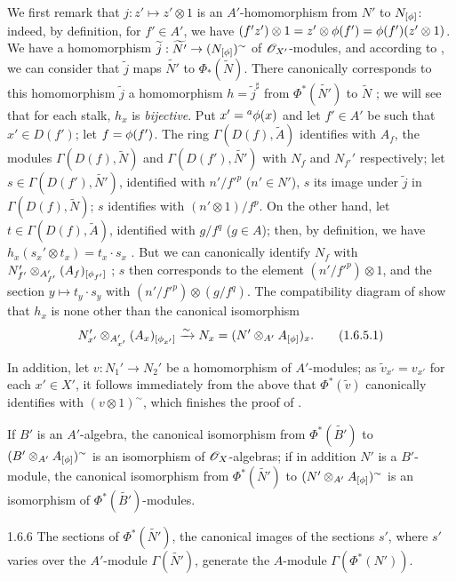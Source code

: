 We first remark that $j:z'\mapsto z'\otimes 1$ is an $A'$-homomorphism from $N'$ to
$N_{[\phi]}$: indeed, by definition, for $f'\in A'$, we have
$(f'z')\otimes 1=z'\otimes\phi(f')=\phi(f')(z'\otimes 1)$. We have  a
homomorphism $\widetilde{j}:\widetilde{N'}\to(N_{[\phi]})^\sim$ of $\mathscr{O}_{X'}$-modules, and
according to , we can consider that $\widetilde{j}$ maps $\widetilde{N'}$
to $\Phi_*(\widetilde{N})$. There canonically corresponds to this homomorphism
$\widetilde{j}$ a homomorphism $h=\widetilde{j}^\sharp$ from $\Phi^*(\widetilde{N'})$ to
$\widetilde{N}$ ; we will see that for each stalk, $h_x$ is \emph{bijective}.
Put $x'={}^a\phi(x)$ and let $f'\in A'$ be such that $x'\in D(f')$; let $f=\phi(f')$. The
ring $\Gamma(D(f),\widetilde{A})$ identifies with $A_f$, the modules
$\Gamma(D(f),\widetilde{N})$ and $\Gamma(D(f'),\widetilde{N'})$ with $N_f$ and $N_{f'}'$
respectively; let $s\in\Gamma(D(f'),\widetilde{N'})$, identified with $n'/{f'}^p$
($n'\in N'$), $s$ its image under $\widetilde{j}$ in $\Gamma(D(f),\widetilde{N})$; $s$
identifies with $(n'\otimes 1)/f^p$. On the other hand, let $t\in\Gamma(D(f),\widetilde{A})$,
identified with $g/f^q$ ($g\in A$); then, by definition, we have
$h_x(s_x'\otimes t_x)=t_x\cdot s_x$ . But we can canonically identify $N_f$
with $N_{f'}'\otimes_{A_{f'}'}(A_f)_{[\phi_{f'}]}$ ; $s$ then corresponds
to the element $(n'/{f'}^p)\otimes 1$, and the section $y\mapsto t_y\cdot s_y$ with
$(n'/{f'}^p)\otimes(g/f^q)$. The compatibility diagram of  show that $h_x$
is none other than the canonical isomorphism
\[
  N_{x'}'\otimes_{A_{x'}'}(A_x)_{[\phi_{x'}]}\xrightarrow{\sim} N_x=(N'\otimes_{A'}A_{[\phi]})_x.
  \tag{1.6.5.1}
\]

In addition, let $v:N_1'\to N_2'$ be a homomorphism of $A'$-modules; as
$\widetilde{v}_{x'}=v_{x'}$ for each $x'\in X'$, it follows immediately from the above that
$\Phi^*(\widetilde{v})$ canonically identifies with $(v\otimes 1)^\sim$, which finishes the
proof of .

If $B'$ is an $A'$-algebra, the canonical isomorphism from $\Phi^*(\widetilde{B'})$ to
$(B'\otimes_{A'}A_{[\phi]})^\sim$ is an isomorphism of $\mathscr{O}_X$-algebras; if in addition $N'$
is a $B'$-module, the canonical isomorphism from $\Phi^*(\widetilde{N'})$ to
$(N'\otimes_{A'}A_{[\phi]})^\sim$ is an isomorphism of $\Phi^*(\widetilde{B'})$-modules.

\begin{envs}[Corollary]{1.6.6}
\label{cor-1.1.6.6}
The sections of $\Phi^*(\widetilde{N'})$, the canonical images of the sections $s'$, where
$s'$ varies over the $A'$-module $\Gamma(\widetilde{N'})$, generate the $A$-module
$\Gamma(\Phi^*(N'))$.
\end{envs}

